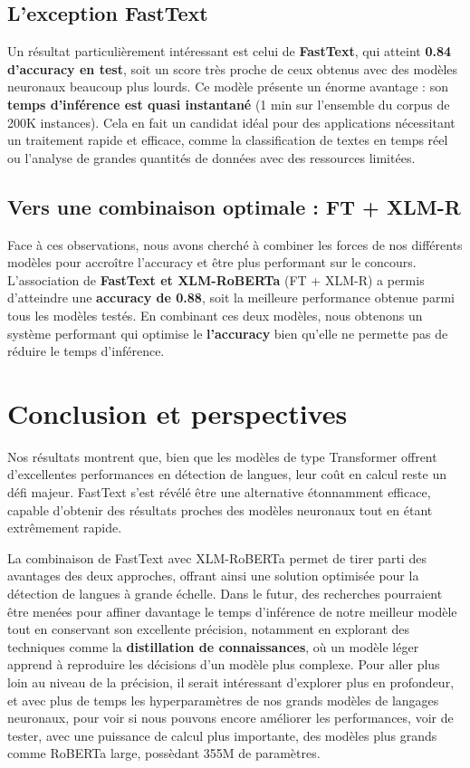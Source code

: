 \subsection{L'exception FastText}

Un résultat particulièrement intéressant est celui de \textbf{FastText}, qui atteint \textbf{0.84 d'accuracy en test}, soit un score très proche de ceux obtenus avec des modèles neuronaux beaucoup plus lourds. Ce modèle présente un énorme avantage : son \textbf{temps d'inférence est quasi instantané} (1 min sur l’ensemble du corpus de 200K instances). Cela en fait un candidat idéal pour des applications nécessitant un traitement rapide et efficace, comme la classification de textes en temps réel ou l’analyse de grandes quantités de données avec des ressources limitées.

\subsection{Vers une combinaison optimale : FT + XLM-R}

Face à ces observations, nous avons cherché à combiner les forces de nos différents modèles pour accroître l'accuracy et être plus performant sur le concours. L’association de \textbf{FastText et XLM-RoBERTa} (FT + XLM-R) a permis d’atteindre une \textbf{accuracy de 0.88}, soit la meilleure performance obtenue parmi tous les modèles testés.
En combinant ces deux modèles, nous obtenons un système performant qui optimise le \textbf{l'accuracy} bien qu'elle ne permette pas de réduire le temps d'inférence.

\section{Conclusion et perspectives}

Nos résultats montrent que, bien que les modèles de type Transformer offrent d’excellentes performances en détection de langues, leur coût en calcul reste un défi majeur. FastText s’est révélé être une alternative étonnamment efficace, capable d’obtenir des résultats proches des modèles neuronaux tout en étant extrêmement rapide.

La combinaison de FastText avec XLM-RoBERTa permet de tirer parti des avantages des deux approches, offrant ainsi une solution optimisée pour la détection de langues à grande échelle. Dans le futur, des recherches pourraient être menées pour affiner davantage le temps d'inférence de notre meilleur modèle tout en conservant son excellente précision, notamment en explorant des techniques comme la \textbf{distillation de connaissances}, où un modèle léger apprend à reproduire les décisions d’un modèle plus complexe. 
Pour aller plus loin au niveau de la précision, il serait intéressant d'explorer plus en profondeur, et avec plus de temps les hyperparamètres de nos grands modèles de langages neuronaux, pour voir si nous pouvons encore améliorer les performances, voir de tester, avec une puissance de calcul plus importante, des modèles plus grands comme RoBERTa large, possèdant 355M de paramètres.

